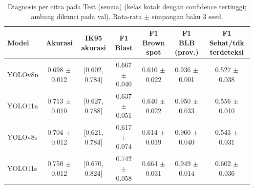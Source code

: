 \begin{table}[!t]
\centering
\caption{Diagnosis per citra pada Test (semua) (kelas kotak dengan confidence tertinggi; ambang dikunci pada val). Rata-rata $\pm$ simpangan baku 3 seed.}
\label{tab:diagnosis_test_dengan_background}
\footnotesize
\begin{tabular}{lcccccc}
\hline
\textbf{Model} & \textbf{Akurasi} & \textbf{IK95 akurasi} & \textbf{F1 Blast} & \textbf{F1 Brown spot} & \textbf{F1 BLB (prov.)} & \textbf{F1 Sehat/tdk terdeteksi} \\
\hline
YOLOv8n & 0.698 $\pm$ 0.012 & [0.602, 0.784] & 0.667 $\pm$ 0.040 & 0.610 $\pm$ 0.022 & 0.936 $\pm$ 0.001 & 0.527 $\pm$ 0.038 \\
YOLO11n & 0.713 $\pm$ 0.010 & [0.627, 0.788] & 0.637 $\pm$ 0.051 & 0.640 $\pm$ 0.022 & 0.950 $\pm$ 0.033 & 0.556 $\pm$ 0.010 \\
YOLOv8s & 0.704 $\pm$ 0.012 & [0.621, 0.784] & 0.617 $\pm$ 0.074 & 0.614 $\pm$ 0.019 & 0.960 $\pm$ 0.040 & 0.543 $\pm$ 0.031 \\
YOLO11s & 0.750 $\pm$ 0.012 & [0.670, 0.824] & 0.742 $\pm$ 0.058 & 0.664 $\pm$ 0.031 & 0.949 $\pm$ 0.014 & 0.602 $\pm$ 0.036 \\
\hline
\end{tabular}
\end{table}
